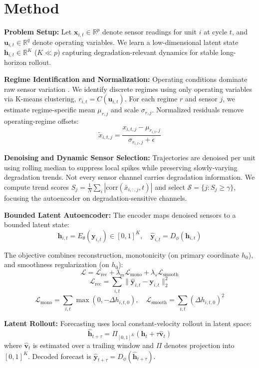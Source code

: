 \documentclass[letterpaper]{article}
\begin{document}
\section{Method}

\textbf{Problem Setup:} Let $\mathbf{x}_{i,t} \in \mathbb{R}^p$ denote sensor readings for unit $i$ at cycle $t$, and $\mathbf{u}_{i,t} \in \mathbb{R}^q$ denote operating variables. We learn a low-dimensional latent state $\mathbf{h}_{i,t} \in \mathbb{R}^K$ ($K \ll p$) capturing degradation-relevant dynamics for stable long-horizon rollout.

\textbf{Regime Identification and Normalization:} Operating conditions dominate raw sensor variation \cite{lei2018application}. We identify discrete regimes using only operating variables via K-means clustering, $r_{i,t} = C(\mathbf{u}_{i,t})$. For each regime $r$ and sensor $j$, we estimate regime-specific mean $\mu_{r,j}$ and scale $\sigma_{r,j}$. Normalized residuals remove operating-regime offsets:
$$\tilde{x}_{i,t,j} = \frac{x_{i,t,j} - \mu_{r_{i,t},j}}{\sigma_{r_{i,t},j} + \epsilon}$$

\textbf{Denoising and Dynamic Sensor Selection:} Trajectories are denoised per unit using rolling median to suppress local spikes while preserving slowly-varying degradation trends. Not every sensor channel carries degradation information. We compute trend scores $S_j = \frac{1}{N}\sum_i |\text{corr}(\bar{x}_{i,:,j}, t)|$ and select $\mathcal{S} = \{j : S_j \geq \gamma\}$, focusing the autoencoder on degradation-sensitive channels.

\textbf{Bounded Latent Autoencoder:} The encoder maps denoised sensors to a bounded latent state:
$$\mathbf{h}_{i,t} = E_\theta(\mathbf{y}_{i,t}) \in [0,1]^K, \quad \hat{\mathbf{y}}_{i,t} = D_\phi(\mathbf{h}_{i,t})$$

The objective combines reconstruction, monotonicity (on primary coordinate $h_0$), and smoothness regularization (on $h_0$):
$$\mathcal{L} = \mathcal{L}_{\text{rec}} + \lambda_m \mathcal{L}_{\text{mono}} + \lambda_s \mathcal{L}_{\text{smooth}}$$
$$\mathcal{L}_{\text{rec}} = \sum_{i,t} \|\hat{\mathbf{y}}_{i,t} - \mathbf{y}_{i,t}\|_2^2$$
$$\mathcal{L}_{\text{mono}} = \sum_{i,t} \max(0, -\Delta h_{i,t,0}), \quad \mathcal{L}_{\text{smooth}} = \sum_{i,t} (\Delta h_{i,t,0})^2$$

\textbf{Latent Rollout:} Forecasting uses local constant-velocity rollout in latent space:
$$\hat{\mathbf{h}}_{t+\tau} = \Pi_{[0,1]^K}(\mathbf{h}_t + \tau \hat{\mathbf{v}}_t)$$
where $\hat{\mathbf{v}}_t$ is estimated over a trailing window and $\Pi$ denotes projection into $[0,1]^K$. Decoded forecast is $\hat{\mathbf{y}}_{t+\tau} = D_\phi(\hat{\mathbf{h}}_{t+\tau})$.
\end{document}
